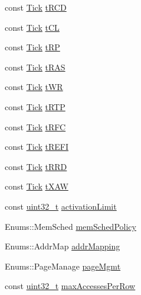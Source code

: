 \begin{DoxyCompactItemize}
\item 
const \hyperlink{base_2types_8hh_a5c8ed81b7d238c9083e1037ba6d61643}{Tick} \hyperlink{classDRAMCtrl_a482d43285a450eeb021dcb7065741b33}{tRCD}
\item 
const \hyperlink{base_2types_8hh_a5c8ed81b7d238c9083e1037ba6d61643}{Tick} \hyperlink{classDRAMCtrl_a96c42cd586bf995db505fbb5c0252ac1}{tCL}
\item 
const \hyperlink{base_2types_8hh_a5c8ed81b7d238c9083e1037ba6d61643}{Tick} \hyperlink{classDRAMCtrl_aa3828096d625ef4b6b497ce02b3fac85}{tRP}
\item 
const \hyperlink{base_2types_8hh_a5c8ed81b7d238c9083e1037ba6d61643}{Tick} \hyperlink{classDRAMCtrl_a91e2a0dae0024646d5cf40c844996bcc}{tRAS}
\item 
const \hyperlink{base_2types_8hh_a5c8ed81b7d238c9083e1037ba6d61643}{Tick} \hyperlink{classDRAMCtrl_a3c3ee9ca057928cc876fc54a20356535}{tWR}
\item 
const \hyperlink{base_2types_8hh_a5c8ed81b7d238c9083e1037ba6d61643}{Tick} \hyperlink{classDRAMCtrl_a850e39d6fd527d4992315e86a8978292}{tRTP}
\item 
const \hyperlink{base_2types_8hh_a5c8ed81b7d238c9083e1037ba6d61643}{Tick} \hyperlink{classDRAMCtrl_ada7c680f071957137175c60c125b929a}{tRFC}
\item 
const \hyperlink{base_2types_8hh_a5c8ed81b7d238c9083e1037ba6d61643}{Tick} \hyperlink{classDRAMCtrl_a2082aad1296022a7ff2d7b1a95bae882}{tREFI}
\item 
const \hyperlink{base_2types_8hh_a5c8ed81b7d238c9083e1037ba6d61643}{Tick} \hyperlink{classDRAMCtrl_ac09c7763d97a33e93c89f266ed29df29}{tRRD}
\item 
const \hyperlink{base_2types_8hh_a5c8ed81b7d238c9083e1037ba6d61643}{Tick} \hyperlink{classDRAMCtrl_a32fe8eab168b3a01214255fde6091e0b}{tXAW}
\item 
const \hyperlink{Type_8hh_a435d1572bf3f880d55459d9805097f62}{uint32\_\-t} \hyperlink{classDRAMCtrl_aba56ec7c49633bf73f29b24ff6a18b38}{activationLimit}
\item 
Enums::MemSched \hyperlink{classDRAMCtrl_a77153a963ea47f1f424595cbc94461e7}{memSchedPolicy}
\item 
Enums::AddrMap \hyperlink{classDRAMCtrl_a39c22fc32946a97479fd50b6d4db1ed0}{addrMapping}
\item 
Enums::PageManage \hyperlink{classDRAMCtrl_a0ad0ee34c37f7b1694ad9aa4495c2c0f}{pageMgmt}
\item 
const \hyperlink{Type_8hh_a435d1572bf3f880d55459d9805097f62}{uint32\_\-t} \hyperlink{classDRAMCtrl_ab0ff1e80c0fcb937ef53eee0175cbd13}{maxAccessesPerRow}

\end{DoxyCompactItemize}
